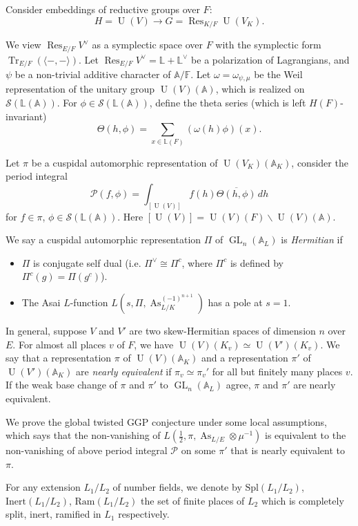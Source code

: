 \documentclass[11pt, reqno]{amsart}
\numberwithin{equation}{subsection}
\theoremstyle{plain}
\theoremstyle{definition}
\newcommand{\BA}{\mathbb A}
\renewcommand{\AA}{\mathbb A}
\newcommand{\LL}{\mathbb L}
\newcommand{\ol}{\overline}
\renewcommand{\P}{\mathcal P}
\newcommand{\cS}{\mathcal S}
\DeclareMathOperator{\As}{As}
\DeclareMathOperator{\GL}{GL}
\DeclareMathOperator{\Res}{Res}
\DeclareMathOperator{\Tr}{Tr}
\DeclareMathOperator{\U}{U}
\begin{document}
Consider embeddings of reductive groups over $F$:
\[
H=\U(V) \to G=\Res_{K/F} \U(V_K).
\]

We view $\Res_{E/F} V^\vee$ as a symplectic space over $F$ with the symplectic form 
$\Tr_{E/F}(\langle -, - \rangle)$. Let $\Res_{E/F} V^\vee=\LL + \LL^\vee$ be a polarization of Lagrangians, and $\psi$ be a non-trivial additive character of $\AA / \mathbb F$. 
Let $\omega=\omega_{\psi, \mu}$ be the Weil representation
of the unitary group $\U(V)(\AA)$, which is realized on
$\cS(\LL(\AA))$.
 For $\phi \in \cS(\LL(\AA))$, define the theta series (which is left $H(F)$-invariant)
\[
    \Theta(h,\phi) = 
    \sum_{x \in \LL(F)} (\omega(h)\phi)(x).
\]

Let $\pi$ be a cuspidal automorphic representation of $\U(V_K)(\AA_K)$, consider the period integral
\begin{equation}
  \P(f,\phi) = \int_{[\U(V)]}
         f(h)\ol{\Theta(h,\phi)}\, dh  
\end{equation}
for $f \in \pi$, $\phi \in \cS(\LL(\AA))$. Here $[\U(V)]=\U(V)(F) \backslash \U(V)(\AA)$.\


We say a cuspidal automorphic representation $\Pi$ of $\GL_n(\AA_L)$ is \emph{Hermitian} if
\begin{itemize}
    \item $\Pi$ is conjugate self dual (i.e. $\Pi^\vee \cong \Pi^c$, where $\Pi^c$ is defined by $\Pi^c(g)=\Pi(g^c)$).
    \item The Asai $L$-function $L(s,\Pi,\operatorname{As}_{L/K}^{(-1)^{n+1}})$ has a pole at $s=1$.
\end{itemize}



In general, suppose $V$ and $V'$ are two skew-Hermitian spaces of dimension $n$ over $E$. For almost all places $v$
of $F$, we have $\U(V)(K_v) \simeq \U(V')(K_v)$. We say that a representation
$\pi$ of $\U(V)(\AA_K)$ and a representation
$\pi'$ of $\U(V')(\AA_K)$ are \emph{nearly equivalent}
if $\pi_v \simeq \pi_v'$ for all but finitely many
places $v$. If the weak base change of $\pi$ and $\pi'$ to $\GL_n(\BA_L)$ agree, 
$\pi$ and $\pi'$ are nearly equivalent. 

We prove the global twisted GGP conjecture \cite{TwistedGGP} under some local assumptions, which says that the non-vanishing of $L(\frac12, \pi, \As_{L/E} \otimes \mu^{-1})$ is equivalent to the non-vanishing of above period integral $\mathcal{P}$ on some $\pi'$ that is nearly equivalent to $\pi$. 

For any extension $L_1/L_2$ of number fields, we denote by $\mathrm{Spl}(L_1/L_2)$, $\mathrm{Inert}(L_1/L_2)$, $\mathrm{Ram}(L_1/L_2)$ the set of finite places of $L_2$ which is completely split, inert, ramified in $L_1$ respectively.
\end{document}
